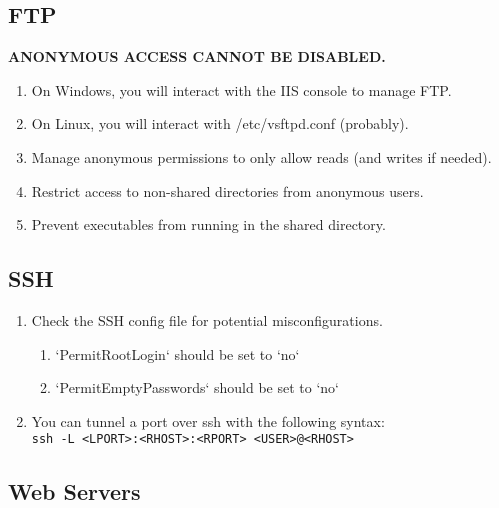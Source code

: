\documentclass[12pt,letterpaper]{article}
\def\code#1{\textcolor{c2}{\texttt{#1}}}
\def\bf#1{\textbf{#1}}
\begin{document}
\subsection{FTP}

\bf{ANONYMOUS ACCESS CANNOT BE DISABLED.}

\begin{enumerate}
	\item On Windows, you will interact with the IIS console to manage FTP.
	\item On Linux, you will interact with /etc/vsftpd.conf (probably).
	\item Manage anonymous permissions to only allow reads (and writes if needed).
	\item Restrict access to non-shared directories from anonymous users.
	\item Prevent executables from running in the shared directory.
\end{enumerate}

\subsection{SSH}

\begin{enumerate}
	\item Check the SSH config file for potential misconfigurations.
	\begin{enumerate}
		\item `PermitRootLogin` should be set to `no`
		\item `PermitEmptyPasswords` should be set to `no`
	\end{enumerate}
	\item You can tunnel a port over ssh with the following syntax: \\
		\code{ssh -L <LPORT>:<RHOST>:<RPORT> <USER>@<RHOST>}
\end{enumerate}

\subsection{Web Servers}
\end{document}
